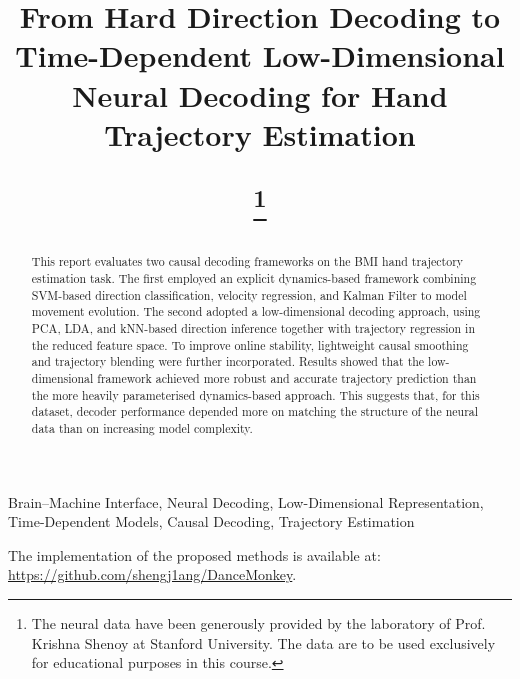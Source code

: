 \documentclass[conference]{IEEEtran}
\begin{document}
\small
\title{\LARGE\bfseries From Hard Direction Decoding to Time-Dependent Low-Dimensional Neural Decoding for Hand Trajectory Estimation

%
\thanks{The neural data have been generously provided by the laboratory of Prof. Krishna Shenoy at Stanford University. The 
data are to be used exclusively for educational purposes in this course.}
}

\author{
}

\maketitle

\begin{abstract}
 This report evaluates two causal decoding frameworks on the BMI hand trajectory estimation task. The first employed an explicit dynamics-based framework combining SVM-based direction classification, velocity regression, and Kalman Filter to model movement evolution. The second adopted a low-dimensional decoding approach, using PCA, LDA, and kNN-based direction inference together with trajectory regression in the reduced feature space. To improve online stability, lightweight causal smoothing and trajectory blending were further incorporated. Results showed that the low-dimensional framework achieved more robust and accurate trajectory prediction than the more heavily parameterised dynamics-based approach. This suggests that, for this dataset, decoder performance depended more on matching the structure of the neural data than on increasing model complexity.
\end{abstract}


\begin{IEEEkeywords}
Brain–Machine Interface, Neural Decoding, Low-Dimensional Representation, Time-Dependent Models, Causal Decoding, Trajectory Estimation
\end{IEEEkeywords}








The implementation of the proposed methods is available at: \url{https://github.com/shengj1ang/DanceMonkey}.
\end{document}
